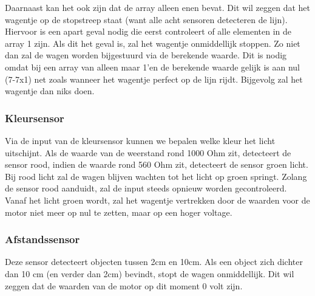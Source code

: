 \documentclass[kulak]{kulakarticle} %
\begin{document}
Daarnaast kan het ook zijn dat de array alleen enen bevat. Dit wil zeggen dat het wagentje op de stopstreep staat (want alle acht sensoren detecteren de lijn). Hiervoor is een apart geval nodig die eerst controleert of alle elementen in de array 1 zijn. Als dit het geval is, zal het wagentje onmiddellijk stoppen. Zo niet dan zal de wagen worden bijgestuurd via de berekende waarde. Dit is nodig omdat bij een array van alleen maar 1’en de berekende waarde gelijk is aan nul (7-7x1) net zoals wanneer het wagentje perfect op de lijn rijdt. Bijgevolg zal het wagentje dan niks doen.
\subsubsection{Kleursensor}
Via de input van de kleursensor kunnen we bepalen welke kleur het licht uitschijnt. Als de waarde van de weerstand rond 1000 Ohm zit, detecteert de sensor rood, indien de waarde rond 560 Ohm zit, detecteert de sensor groen licht. Bij rood licht zal de wagen blijven wachten tot het licht op groen springt. Zolang de sensor rood aanduidt, zal de input steeds opnieuw worden gecontroleerd. Vanaf het licht groen wordt, zal het wagentje vertrekken door de waarden voor de motor niet meer op nul te zetten, maar op een hoger voltage.
\subsubsection{Afstandssensor}
Deze sensor detecteert objecten tussen 2cm en 10cm. Als een object zich dichter dan 10 cm (en verder dan 2cm) bevindt, stopt de wagen onmiddellijk. Dit wil zeggen dat de waarden van de motor op dit moment 0 volt zijn.
\end{document}
